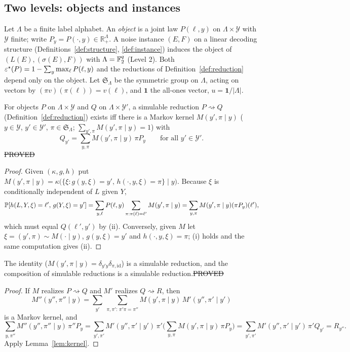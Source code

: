 \subsection{Two levels: objects and instances}\label{sec:levels}

\begin{definition}\label{def:object}
Let $\Lambda$ be a finite label alphabet. An \emph{object} is a joint law $P(\ell,y)$ on $\Lambda\times\mathcal Y$ with $\mathcal Y$ finite; write $P_y=P(\cdot,y)\in\mathbb R_+^\Lambda$.
A noise instance $(E,F)$ on a linear decoding structure (Definitions~\ref{def:structure}, \ref{def:instance}) induces the object of $(L(E),(\sigma(E),F))$ with $\Lambda=\mathbb{F}_2^q$ (Level 2).
Both $\varepsilon^{\star}(P)=1-\sum_y\max_\ell P(\ell,y)$ and the reductions of Definition~\ref{def:reduction} depend only on the object.
Let $\mathfrak S_\Lambda$ be the symmetric group on $\Lambda$, acting on vectors by $(\pi v)(\pi(\ell))=v(\ell)$, and $\mathbf 1$ the all-ones vector, $u=\mathbf 1/|\Lambda|$.
\end{definition}

\begin{lemma}\label{lem:kernel}
For objects $P$ on $\Lambda\times\mathcal Y$ and $Q$ on $\Lambda\times\mathcal Y'$, a simulable reduction $P\rightsquigarrow Q$ (Definition~\ref{def:reduction}) exists iff there is a Markov kernel
$M(y',\pi\mid y)$ ($y\in\mathcal Y$, $y'\in\mathcal Y'$, $\pi\in\mathfrak S_\Lambda$; $\sum_{y',\pi}M(y',\pi\mid y)=1$) with
\[
Q_{y'}=\sum_{y,\pi}M(y',\pi\mid y)\,\pi P_y\qquad\text{for all }y'\in\mathcal Y'.
\]
\hfill\st{PROVED}
\end{lemma}
\begin{proof}
Given $(\kappa,g,h)$ put $M(y',\pi\mid y)=\kappa\big(\{\xi:g(y,\xi)=y',\,h(\cdot,y,\xi)=\pi\}\mid y\big)$. Because $\xi$ is conditionally independent of $L$ given $Y$,
\[
\mathbb{P}[h(L,Y,\xi)=\ell',\,g(Y,\xi)=y']=\sum_{y,\ell}P(\ell,y)\sum_{\pi:\pi(\ell)=\ell'}M(y',\pi\mid y)=\sum_{y,\pi}M(y',\pi\mid y)(\pi P_y)(\ell'),
\]
which must equal $Q(\ell',y')$ by (ii). Conversely, given $M$ let $\xi=(y',\pi)\sim M(\cdot\mid y)$, $g(y,\xi)=y'$ and $h(\cdot,y,\xi)=\pi$; (i) holds and the same computation gives (ii).
\end{proof}

\begin{proposition}\label{prop:category}
The identity ($M(y',\pi\mid y)=\delta_{y'y}\delta_{\pi,\mathrm{id}}$) is a simulable reduction, and the composition of simulable reductions is a simulable reduction.\hfill\st{PROVED}
\end{proposition}
\begin{proof}
If $M$ realizes $P\rightsquigarrow Q$ and $M'$ realizes $Q\rightsquigarrow R$, then
\[
M''(y'',\pi''\mid y)=\sum_{y'}\ \sum_{\pi,\pi':\,\pi'\pi=\pi''}M(y',\pi\mid y)\,M'(y'',\pi'\mid y')
\]
is a Markov kernel, and
\[
\sum_{y,\pi''}M''(y'',\pi''\mid y)\,\pi''P_y=\sum_{y',\pi'}M'(y'',\pi'\mid y')\,\pi'\Big(\sum_{y,\pi}M(y',\pi\mid y)\,\pi P_y\Big)=\sum_{y',\pi'}M'(y'',\pi'\mid y')\,\pi'Q_{y'}=R_{y''}.
\]
Apply Lemma~\ref{lem:kernel}.
\end{proof}

